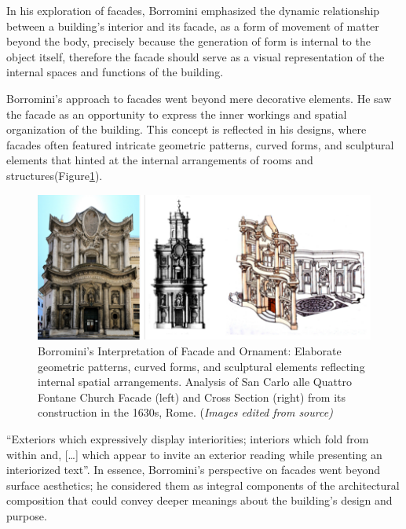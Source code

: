 In his exploration of facades, Borromini emphasized the dynamic relationship between a building's interior and its facade, as a form of movement of matter beyond the body, precisely because the generation of form is internal to the object itself\cite{Benjamin2006}, therefore the facade should serve as a visual representation of the internal spaces and functions of the building.

Borromini's approach to facades went beyond mere decorative elements.
He saw the facade as an opportunity to express the inner workings and spatial organization of the building.
This concept is reflected in his designs, where facades often featured intricate geometric patterns, curved forms, and sculptural elements that hinted at the internal arrangements of rooms and structures(Figure\ref{fig:BorrominiArchitecture}).

     \begin{figure}[htb]
          \centering
          \includegraphics[width= \linewidth]{Images/BaroquefacadeBorromini}
          \caption{Borromini's Interpretation of Facade and Ornament: Elaborate geometric patterns, curved forms, and sculptural elements reflecting internal spatial arrangements. Analysis of San Carlo alle Quattro Fontane Church Facade (left) and Cross Section (right) from its construction in the 1630s, Rome. (\textit{Images edited from source)}}
          \label{fig:BorrominiArchitecture}
        \end{figure}

``Exteriors which expressively display interiorities;
interiors which fold from within and, [\ldots] which appear to invite an exterior reading while presenting an interiorized text''\cite{Biglieri2004}.
In essence, Borromini's perspective on facades went beyond surface aesthetics;
he considered them as integral components of the architectural composition that could convey deeper meanings about the building's design and purpose.

